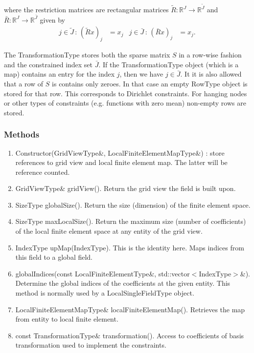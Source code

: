 \documentclass[11pt,a4paper,DIV11,%
notitlepage,oneside,abstracton,%
bibtotoc]{scrartcl}
\begin{document}
where the restriction matrices are rectangular matrices $\tilde{R} :
\mathbb{R}^J \to \mathbb{R}^{\tilde{J}}$ and $\bar{R} :
\mathbb{R}^J \to \mathbb{R}^{\bar{J}}$ given by
\begin{align}
j\in\tilde{J} \,:\, (\tilde{R}x)_j &= x_j &
j\in\bar{J} \,:\, (\bar{R}x)_j &= x_j.
\end{align}

The TransformationType stores both the sparse matrix $S$ in a row-wise
fashion and the constrained
index set $\bar{J}$. If the TransformationType object (which is a map)
contains an entry for the index $j$, then we have $j\in\bar{J}$. It
it is also allowed that a row of $S$ is contains only zeroes. In that
case an empty RowType object is stored for that row. This corresponds
to Dirichlet constraints. For hanging nodes or other types of
constraints (e.g. functions with zero mean) non-empty rows are stored. 

\subsubsection{Methods}

\begin{enumerate}[1)]
\item Constructor(GridViewType\&, LocalFiniteElementMapType\&) : store
  references to grid view and local finite element map. The latter
  will be reference counted.
\item GridViewType\& gridView(). Return the grid view 
  the field is built upon.
\item SizeType globalSize(). Return the size (dimension) of the
  finite element space.  
\item SizeType maxLocalSize(). Return the maximum size (number of
  coefficients) of the local finite element space at any entity of the
  grid view.
\item IndexType upMap(IndexType). This is the identity here. Maps
  indices from this field to a global field.
\item globalIndices(const LocalFiniteElementType\&, std::vector$<$IndexType$>$\&).
  Determine the global indices of the
  coefficients at the given entity. This method is normally used by a
  LocalSingleFieldType object.
\item LocalFiniteElementMapType\& localFiniteElementMap(). Retrieves
  the map from entity to local finite element.
\item const TransformationType\& transformation(). Access to
  coefficients of basis transformation used to implement the constraints.
\end{enumerate}
\end{document}
